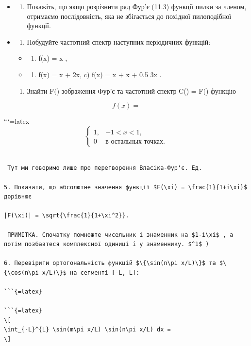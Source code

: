 \documentclass[
  ukrainian,
]{article}
\providecommand{\tightlist}{%
  \setlength{\itemsep}{0pt}\setlength{\parskip}{0pt}}
\begin{document}
\begin{itemize}
\item
  \begin{enumerate}
  \def\labelenumi{\arabic{enumi}.}
  \setcounter{enumi}{1}
  \tightlist
  \item
    Покажіть, що якщо розрізнити ряд Фур'є (11.3) функції пилки за
    членом, отримаємо послідовність, яка не збігається до похідної
    пилоподібної функції.
  \end{enumerate}
\item
  \begin{enumerate}
  \def\labelenumi{\arabic{enumi}.}
  \setcounter{enumi}{2}
  \tightlist
  \item
    Побудуйте частотний спектр наступних періодичних функцій:
  \end{enumerate}

  \begin{itemize}
  \tightlist
  \item
    \begin{enumerate}
    \def\labelenumi{\alph{enumi})}
    \tightlist
    \item
      f(x) = \sin x ,
    \end{enumerate}
  \item
    \begin{enumerate}
    \def\labelenumi{\arabic{enumi})}
    \setcounter{enumi}{5}
    \tightlist
    \item
      f(x) = \sin x + \cos 2x, c) f(x) = \sin x + \cos x + 0.5 \sin 3x .
    \end{enumerate}
  \end{itemize}

  \begin{enumerate}
  \def\labelenumi{\arabic{enumi}.}
  \setcounter{enumi}{3}
  \tightlist
  \item
    Знайти F(\xi) зображення Фур'є та частотний спектр C(\xi) =
    \textbar F(\xi)\textbar{} функцію
  \end{enumerate}
\end{itemize}

\[
f(x) =
\]

```{=latex}
\[
\begin{cases} 1, & -1 < x < 1, \\ 0 & \text{в остальных точках.} \end{cases}
\]

\begin{verbatim}

 Тут ми говоримо лише про перетворення Власіка-Фур'є. Ед.

5. Показати, що абсолютне значення функції $F(\xi) = \frac{1}{1+i\xi}$ дорівнює

|F(\xi)| = \sqrt{\frac{1}{1+\xi^2}}.

 ПРИМІТКА. Спочатку помножте чисельник і знаменник на $1-i\xi$ , а потім позбавтеся комплексної одиниці i у знаменнику. $^1$ )

6. Перевірити ортогональність функцій $\{\sin(n\pi x/L)\}$ та $\{\cos(n\pi x/L)\}$ на сегменті [-L, L]:

```{=latex}

```{=latex}
\[
\int_{-L}^{L} \sin(m\pi x/L) \sin(n\pi x/L) dx =
\]
\end{verbatim}
\end{document}
